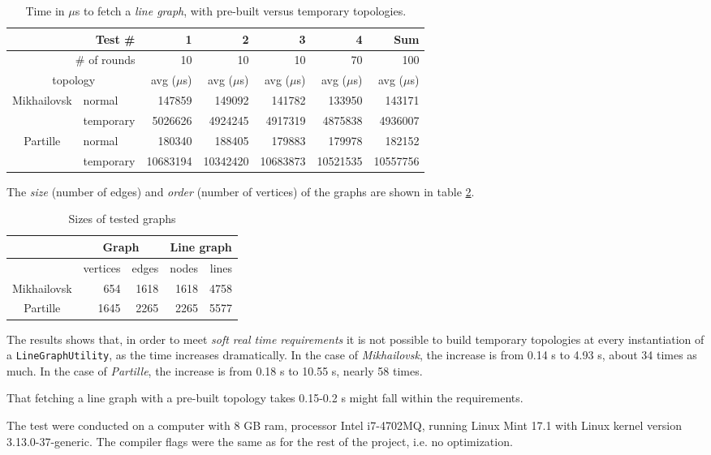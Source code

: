 \documentclass[../main.tex]{subfiles}
\begin{document}
\begin{table}[h]
\centering
\caption{Time in $\mu$s to fetch a \textit{line graph}, with pre-built versus temporary topologies.}
    \begin{tabular}{|c|l|r|r|r|r||r|}
    \hline
    \multicolumn{2}{|r|}{Test \#} & 1 & 2 & 3 & 4 & Sum \\
    \hline
    \hline
    \multicolumn{2}{|r|}{\# of rounds} & 10 & 10 & 10 & 70 & 100\\
    \hline
    \multicolumn{2}{|c||}{topology} & avg ($\mu$s) & avg ($\mu$s) & avg ($\mu$s) & avg ($\mu$s) & avg ($\mu$s) \\
    \hline
    \hline
    \multirow{2}{5em}{Mikhailovsk} & normal & 147859 & 149092 & 141782 & 133950 & 143171 \\
     & temporary & 5026626 & 4924245 & 4917319 & 4875838 & 4936007 \\
    \hline
    \multirow{2}{5em}{Partille} & normal & 180340 & 188405 & 179883 & 179978 & 182152\\
     & temporary & 10683194 & 10342420 & 10683873 & 10521535 & 10557756\\
    \hline
    \end{tabular}
\label{table:test-results}
\end{table}

The \textit{size} (number of edges) and \textit{order} (number of vertices) of the graphs are shown in table \ref{table:graph-sizes}.

\begin{table}[h]
\centering
\caption{Sizes of tested graphs}
    \begin{tabular}{|c|r|r|r|r|}
    \hline
     & \multicolumn{2}{c|}{Graph} & \multicolumn{2}{|c|}{Line graph}  \\
    \hline
     & vertices & edges & nodes & lines \\
    \hline
    \hline
    Mikhailovsk & 654 & 1618 & 1618 & 4758 \\
    \hline
    Partille & 1645 & 2265 & 2265 & 5577 \\
    \hline
    \end{tabular}
\label{table:graph-sizes}
\end{table}

The results shows that, in order to meet \textit{soft real time requirements} it is not possible to build temporary topologies at every instantiation of a \texttt{LineGraphUtility}, as the time increases dramatically. In the case of \textit{Mikhailovsk}, the increase is from 0.14 s to 4.93 s, about 34 times as much. In the case of \textit{Partille}, the increase is from 0.18 s to 10.55 s, nearly 58 times. 

That fetching a line graph with a pre-built topology takes 0.15-0.2 s might fall within the requirements.

The test were conducted on a computer with 8 GB ram, processor Intel i7-4702MQ, running Linux Mint 17.1 with Linux kernel version 3.13.0-37-generic. The compiler flags were the same as for the rest of the project, i.e. no optimization.
\end{document}
